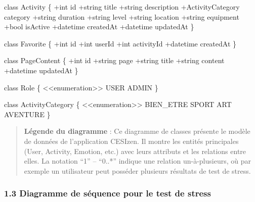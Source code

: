 \documentclass[
]{article}
\newenvironment{Shaded}{}{}
\newcommand{\NormalTok}[1]{#1}
\begin{document}
\begin{Shaded}
\begin{Highlighting}[]
\NormalTok{    class Activity \{}
\NormalTok{        +int id}
\NormalTok{        +string title}
\NormalTok{        +string description}
\NormalTok{        +ActivityCategory category}
\NormalTok{        +string duration}
\NormalTok{        +string level}
\NormalTok{        +string location}
\NormalTok{        +string equipment}
\NormalTok{        +bool isActive}
\NormalTok{        +datetime createdAt}
\NormalTok{        +datetime updatedAt}
\NormalTok{    \}}
    
\NormalTok{    class Favorite \{}
\NormalTok{        +int id}
\NormalTok{        +int userId}
\NormalTok{        +int activityId}
\NormalTok{        +datetime createdAt}
\NormalTok{    \}}
    
\NormalTok{    class PageContent \{}
\NormalTok{        +int id}
\NormalTok{        +string page}
\NormalTok{        +string title}
\NormalTok{        +string content}
\NormalTok{        +datetime updatedAt}
\NormalTok{    \}}
    
\NormalTok{    class Role \{}
\NormalTok{        \textless{}\textless{}enumeration\textgreater{}\textgreater{}}
\NormalTok{        USER}
\NormalTok{        ADMIN}
\NormalTok{    \}}
    
\NormalTok{    class ActivityCategory \{}
\NormalTok{        \textless{}\textless{}enumeration\textgreater{}\textgreater{}}
\NormalTok{        BIEN\_ETRE}
\NormalTok{        SPORT}
\NormalTok{        ART}
\NormalTok{        AVENTURE}
\NormalTok{    \}}
\end{Highlighting}
\end{Shaded}

\begin{quote}
\textbf{Légende du diagramme} : Ce diagramme de classes présente le
modèle de données de l’application CESIzen. Il montre les entités
principales (User, Activity, Emotion, etc.) avec leurs attributs et les
relations entre elles. La notation “1” – “0..*” indique une relation
un-à-plusieurs, où par exemple un utilisateur peut posséder plusieurs
résultats de test de stress.
\end{quote}

\subsubsection{1.3 Diagramme de séquence pour le test de
stress}\label{diagramme-de-suxe9quence-pour-le-test-de-stress}
\end{document}
